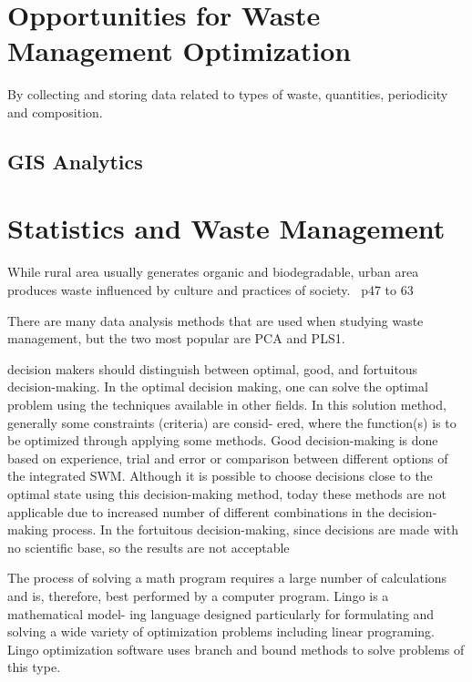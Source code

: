\documentclass[sigconf]{acmart}
\begin{document}



\section{Opportunities for Waste Management Optimization}

By collecting and storing data related to types of waste, quantities, periodicity and  composition.

\subsection{GIS Analytics}


\section{Statistics and Waste Management}




While rural area usually generates organic and biodegradable, urban area produces waste influenced by culture and practices of society.~\cite{chandrappa2012} p47 to 63



There are many data analysis methods that are used when studying waste management, but the two most popular are PCA and PLS1. 
~\cite{bohm2013}



decision makers should distinguish between optimal, good, and fortuitous decision-making. In the optimal decision making, one can solve the optimal problem using the techniques available in other fields. In this solution method, generally some constraints (criteria) are consid-
ered, where the function(s) is to be optimized through applying some methods. Good decision-making is done based on experience, trial and error or comparison between different options of the integrated SWM.
Although it is possible to choose decisions close to the optimal state using this decision-making method, today these methods are not applicable due to increased number of different combinations in the decision-making process. In the fortuitous decision-making, since decisions are made with no scientific base, so the results are not acceptable ~\cite{akbarpour2016}

The process of solving a math program requires a large number of calculations and is, therefore, best performed by a computer program. Lingo is a mathematical model-
ing language designed particularly for formulating and solving a wide variety of optimization problems including linear programing. Lingo optimization software uses branch and bound methods to solve problems of this type. ~\cite{akbarpour2016}
\end{document}
